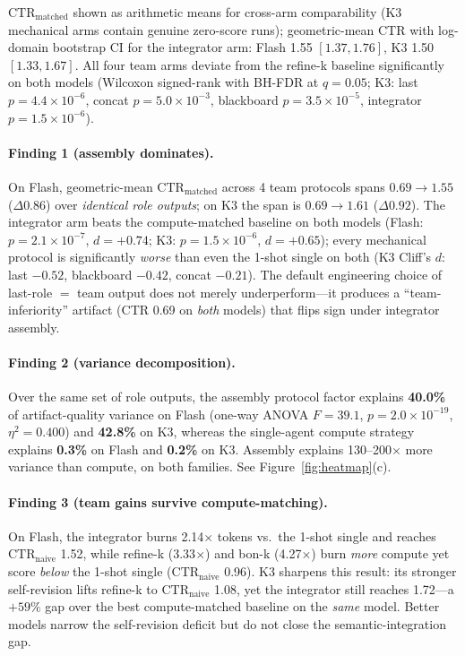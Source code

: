 \documentclass{article}
\newcommand{\ctrn}{\mathrm{CTR}_{\text{naive}}}
\newcommand{\ctrm}{\mathrm{CTR}_{\text{matched}}}
\begin{document}
$\ctrm$ shown as arithmetic means for cross-arm comparability (K3 mechanical arms contain genuine zero-score runs); geometric-mean CTR with log-domain bootstrap CI for the integrator arm: Flash 1.55 $[1.37, 1.76]$, K3 1.50 $[1.33, 1.67]$. All four team arms deviate from the refine-k baseline significantly on both models (Wilcoxon signed-rank with BH-FDR at $q=0.05$; K3: last $p=4.4\times10^{-6}$, concat $p=5.0\times10^{-3}$, blackboard $p=3.5\times10^{-5}$, integrator $p=1.5\times10^{-6}$).

\paragraph{Finding 1 (assembly dominates).} On Flash, geometric-mean $\ctrm$ across 4 team protocols spans $\mathbf{0.69 \to 1.55}$ ($\Delta 0.86$) over \emph{identical role outputs}; on K3 the span is $\mathbf{0.69 \to 1.61}$ ($\Delta 0.92$). The integrator arm beats the compute-matched baseline on both models (Flash: $p=2.1\times10^{-7}$, $d=+0.74$; K3: $p=1.5\times10^{-6}$, $d=+0.65$); every mechanical protocol is significantly \emph{worse} than even the 1-shot single on both (K3 Cliff's $d$: last $-0.52$, blackboard $-0.42$, concat $-0.21$). The default engineering choice of last-role $=$ team output does not merely underperform---it produces a ``team-inferiority'' artifact (CTR 0.69 on \emph{both} models) that flips sign under integrator assembly.

\paragraph{Finding 2 (variance decomposition).} Over the same set of role outputs, the assembly protocol factor explains \textbf{40.0\%} of artifact-quality variance on Flash (one-way ANOVA $F=39.1$, $p=2.0\times10^{-19}$, $\eta^2=0.400$) and \textbf{42.8\%} on K3, whereas the single-agent compute strategy explains \textbf{0.3\%} on Flash and \textbf{0.2\%} on K3. Assembly explains 130--200$\times$ more variance than compute, on both families. See Figure~\ref{fig:heatmap}(c).

\paragraph{Finding 3 (team gains survive compute-matching).} On Flash, the integrator burns 2.14$\times$ tokens vs.\ the 1-shot single and reaches $\ctrn$ 1.52, while refine-k (3.33$\times$) and bon-k (4.27$\times$) burn \emph{more} compute yet score \emph{below} the 1-shot single ($\ctrn$ 0.96). K3 sharpens this result: its stronger self-revision lifts refine-k to $\ctrn$ 1.08, yet the integrator still reaches 1.72---a $+59\%$ gap over the best compute-matched baseline on the \emph{same} model. Better models narrow the self-revision deficit but do not close the semantic-integration gap.
\end{document}
